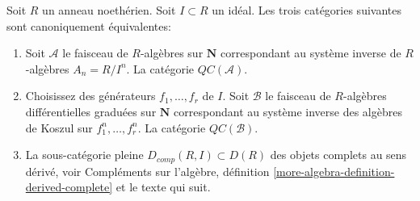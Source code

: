 \begin{proposition}
\label{proposition-derived-complete}
Soit $R$ un anneau noethérien.
Soit $I \subset R$ un idéal.
Les trois catégories suivantes sont canoniquement équivalentes:
\begin{enumerate}
\item Soit $\mathcal{A}$ le faisceau de $R$-algèbres sur $\mathbf{N}$ correspondant au système inverse de $R$-algèbres $A_n = R/I^n$.
La catégorie $\mathit{QC}(\mathcal{A})$.
\item Choisissez des générateurs $f_1, \ldots, f_r$ de $I$.
Soit $\mathcal{B}$ le faisceau de $R$-algèbres différentielles graduées sur $\mathbf{N}$ correspondant au système inverse des algèbres de Koszul sur $f_1^n, \ldots, f_r^n$.
La catégorie $\mathit{QC}(\mathcal{B})$.
\item La sous-catégorie pleine $D_{comp}(R, I) \subset D(R)$ des objets complets au sens dérivé, voir Compléments sur l'algèbre, définition \ref{more-algebra-definition-derived-complete} et le texte qui suit.
\end{enumerate}
\end{proposition}

